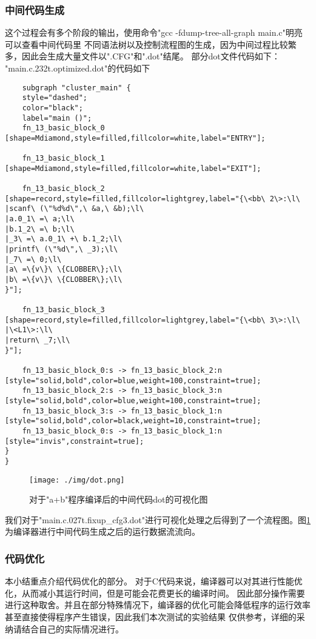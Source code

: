 \documentclass[UTF8]{ctexart}
\begin{document}
\subsubsection{中间代码生成}
这个过程会有多个阶段的输出，使用命令"gcc -fdump-tree-all-graph main.c"明亮可以查看中间代码里
不同语法树以及控制流程图的生成，因为中间过程比较繁多，因此会生成大量文件以".CFG"和".dot"结尾。
部分dot文件代码如下：
"main.c.232t.optimized.dot"的代码如下
\begin{lstlisting}
    subgraph "cluster_main" {
	style="dashed";
	color="black";
	label="main ()";
	fn_13_basic_block_0 [shape=Mdiamond,style=filled,fillcolor=white,label="ENTRY"];

	fn_13_basic_block_1 [shape=Mdiamond,style=filled,fillcolor=white,label="EXIT"];

	fn_13_basic_block_2 [shape=record,style=filled,fillcolor=lightgrey,label="{\<bb\ 2\>:\l\
|scanf\ (\"%d%d\",\ &a,\ &b);\l\
|a.0_1\ =\ a;\l\
|b.1_2\ =\ b;\l\
|_3\ =\ a.0_1\ +\ b.1_2;\l\
|printf\ (\"%d\",\ _3);\l\
|_7\ =\ 0;\l\
|a\ =\{v\}\ \{CLOBBER\};\l\
|b\ =\{v\}\ \{CLOBBER\};\l\
}"];

	fn_13_basic_block_3 [shape=record,style=filled,fillcolor=lightgrey,label="{\<bb\ 3\>:\l\
|\<L1\>:\l\
|return\ _7;\l\
}"];

	fn_13_basic_block_0:s -> fn_13_basic_block_2:n [style="solid,bold",color=blue,weight=100,constraint=true];
	fn_13_basic_block_2:s -> fn_13_basic_block_3:n [style="solid,bold",color=blue,weight=100,constraint=true];
	fn_13_basic_block_3:s -> fn_13_basic_block_1:n [style="solid,bold",color=black,weight=10,constraint=true];
	fn_13_basic_block_0:s -> fn_13_basic_block_1:n [style="invis",constraint=true];
}
}
\end{lstlisting}
\begin{figure}[ht]
    \centering
    \texttt{[image: ./img/dot.png]}
    \caption{对于"a+b"程序编译后的中间代码dot的可视化图}
    \label{fig:aab}
\end{figure}
我们对于"main.c.027t.fixup\_cfg3.dot"进行可视化处理之后得到了一个流程图。图{\ref{fig:aab}
}为编译器进行中间代码生成之后的运行数据流流向。


\subsubsection{代码优化}
本小结重点介绍代码优化的部分。
对于C代码来说，编译器可以对其进行性能优化，从而减小其运行时间，但是可能会花费更长的编译时间。
因此部分操作需要进行这种取舍。并且在部分特殊情况下，编译器的优化可能会降低程序的运行效率甚至直接使得程序产生错误，因此我们本次测试的实验结果
仅供参考，详细的采纳请结合自己的实际情况进行。
\end{document}
